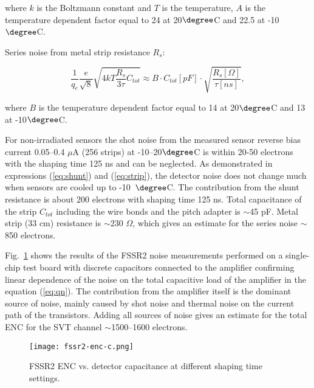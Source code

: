 where $k$ is the Boltzmann constant and $T$ is the temperature, $A$ is the temperature dependent factor equal to 24 at 20$\degree$C and 22.5 at -10$\degree$C.

Series noise from metal strip resistance $R_s$:

\begin{equation} \frac{1}{q_e}\frac{e}{\sqrt{8}}\sqrt{4kT\frac{R_s}{3\tau}C_{tot}} \approx B\cdot C_{tot}[pF]\cdot\sqrt{\frac{R_s[\Omega]}{\tau [ns]}} \label{eq:strip},
\end{equation}

where $B$ is the temperature dependent factor equal to 14 at 20$\degree$C and 13 at -10$\degree$C.

For non-irradiated sensors the shot noise from the measured sensor reverse bias current 0.05--0.4 $\mu$A (256 strips) at -10--20$\degree$C is within 20-50 electrons with the shaping time 125 ns and can be neglected. As demonstrated in expressions (\ref{eq:shunt}) and (\ref{eq:strip}), the detector noise does not change much when sensors are cooled up to -10~$\degree$C. The contribution from the shunt resistance is about 200 electrons with shaping time 125 ns. Total capacitance of the strip $C_{tot}$ including the wire bonds and the pitch adapter is $\sim$45 pF. Metal strip (33 cm) resistance is $\sim$230 $\Omega$, which gives an estimate for the series noise $\sim$850 electrons.

Fig.~\ref{fig:fssr2-enc-c} shows the results of the FSSR2 noise measurements performed on a single-chip test board with discrete capacitors connected to the amplifier confirming linear dependence of the noise on the total capacitive load of the amplifier in the equation (\ref{eq:qn}). The contribution from the amplifier itself is the dominant source of noise, mainly caused by shot noise and thermal noise on the current path of the transistors. Adding all sources of noise gives an estimate for the total ENC for the SVT channel $\sim$1500--1600 electrons.

\begin{figure}[hbt] 
\centering 
\texttt{[image: fssr2-enc-c.png]}
\caption{FSSR2 ENC vs. detector capacitance at different shaping time settings.}
\label{fig:fssr2-enc-c}
\end{figure}
